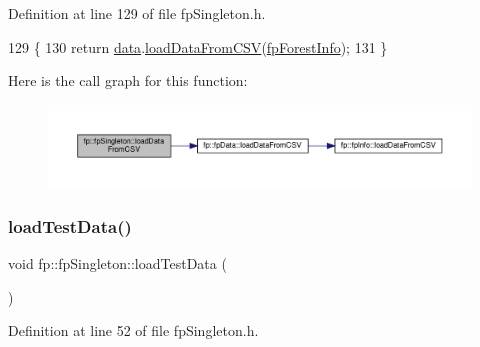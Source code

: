Definition at line 129 of file fp\+Singleton.\+h.


\begin{DoxyCode}
129                                          \{
130                 \textcolor{keywordflow}{return} \hyperlink{classfp_1_1fpSingleton_a2fa16ac6a0f66641749032eeee61b8e9}{data}.\hyperlink{classfp_1_1fpData_a2b4d9be328aaa7acf9a2561150da0402}{loadDataFromCSV}(\hyperlink{classfp_1_1fpSingleton_a85965009befa72a749ae498fa5b6ccfa}{fpForestInfo});
131             \}
\end{DoxyCode}
Here is the call graph for this function\+:\nopagebreak
\begin{figure}[H]
\begin{center}
\leavevmode
\includegraphics[width=350pt]{classfp_1_1fpSingleton_a12178de58f19494062efe5255d937171_cgraph}
\end{center}
\end{figure}
\mbox{\label{classfp_1_1fpSingleton_aea7c3b65ded387322d7d5ce48ab96215}} 
\subsubsection{\texorpdfstring{load\+Test\+Data()}{loadTestData()}}
{\footnotesize\ttfamily void fp\+::fp\+Singleton\+::load\+Test\+Data (\begin{DoxyParamCaption}{ }\end{DoxyParamCaption})\hspace{0.3cm}{\ttfamily [inline]}}



Definition at line 52 of file fp\+Singleton.\+h.



